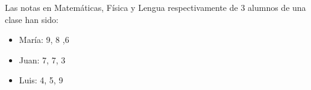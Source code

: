 \documentclass[addpoints,spanish, 12pt,a4paper]{exam}
\begin{document}
\begin{questions}


\question Las notas en Matemáticas, Física y Lengua respectivamente de 3 alumnos de una clase han sido:
\begin{itemize}
    \item María: 9, 8 ,6
    \item Juan: 7, 7, 3
    \item Luis: 4, 5, 9
\end{itemize}


\end{questions}
\end{document}

